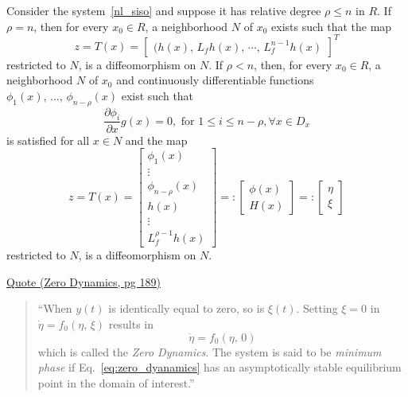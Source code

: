 \documentclass[twocolumn]{article}    %
\begin{document}
\begin{remark}[8.1, pg 188]
    Consider the system~\eqref{nl_siso} and suppose it has relative degree \(\rho \leq n\) in \(R\). If \(\rho=n\), then for every \(x_0 \in R\), a neighborhood \(N\) of \(x_0\) exists such that the map 
    \begin{equation*}
        z = T(x) = \begin{bmatrix}
            (h(x),\, L_fh(x),\,\cdots,\, L_f^{n-1}h(x)
        \end{bmatrix}^T
    \end{equation*}
    restricted to \(N\), is a diffeomorphism on \(N\). If \(\rho < n\), then, for every \(x_0\in R\), a neighborhood \(N\) of \(x_0\) and continuously differentiable functions \(\phi_1(x),\, \dots,\, \phi_{n-\rho}(x)\) exist such that
    \begin{equation*}
        \frac{\partial \phi_i}{\partial x} g(x) =0, \text{ for } 1\leq i \leq n-\rho, \forall x \in D_x
    \end{equation*}
    is satisfied for all \(x \in N\) and the map
    \begin{equation*}
        z = T(x) = \begin{bmatrix}
            \phi_1(x) \\ \vdots \\ \phi_{n-\rho}(x) \\ h(x) \\ \vdots \\ L_f^{\rho-1}h(x)
        \end{bmatrix} =: \begin{bmatrix}
            \phi(x) \\ H(x)
        \end{bmatrix} =: \begin{bmatrix}
            \eta \\ \xi
        \end{bmatrix}
    \end{equation*}
    restricted to \(N\), is a diffeomorphism on \(N\).
\end{remark}


\noindent\underline{Quote (Zero Dynamics, pg 189)}
\begin{quote}
    ``When \(y(t)\) is identically equal to zero, so is \(\xi(t)\). Setting \(\xi =0\) in \(\dot{\eta} = f_0(\eta,\, \xi)\) results in 
    \begin{equation} \label{eq:zero_dyanamics}
        \dot{\eta} = f_0(\eta,\, 0)
    \end{equation}
    which is called the \emph{Zero Dynamics}. The system is said to be \emph{minimum phase} if Eq.~\eqref{eq:zero_dyanamics} has an asymptotically stable equilibrium point in the domain of interest.'' 
\end{quote}
\end{document}
